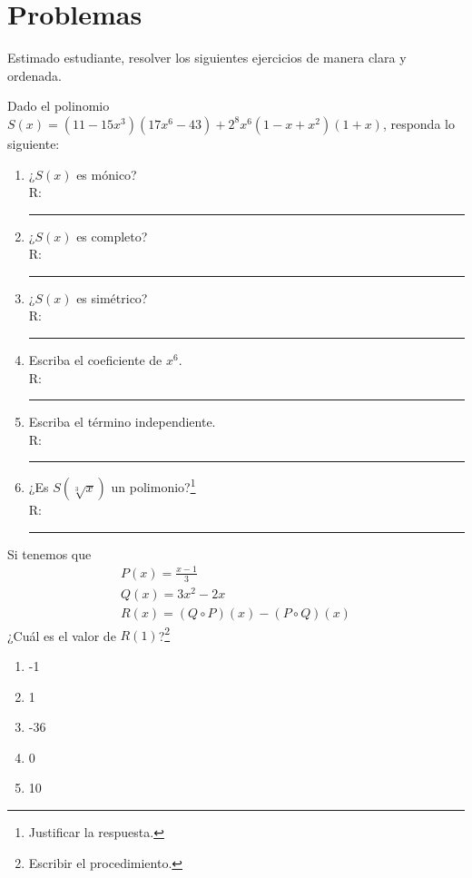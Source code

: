 \section*{\large Problemas}

Estimado estudiante, resolver los siguientes ejercicios de manera clara y ordenada.

\begin{exercise}
    Dado el polinomio $S(x) = (11 - 15x^3)(17x^6 - 43) + 2^8 x^6 (1 - x + x^2)(1 + x)$, responda lo siguiente:
    \begin{multicols}{2}
        \begin{enumerate}
            \item ¿$S(x)$ es mónico? \\R: \rule{1cm}{0.1mm}
            \item ¿$S(x)$ es completo? \\R: \rule{1cm}{0.1mm}
            \item ¿$S(x)$ es simétrico? \\R: \rule{1cm}{0.1mm}
            \item Escriba el coeficiente de $x^6$. \\R: \rule{1cm}{0.1mm}
            \item Escriba el término independiente.\\ R: \rule{1cm}{0.1mm}
            \item ¿Es $S(\sqrt[3]{x})$ un polimonio?\footnote{Justificar la respuesta.} \\ R: \rule{2cm}{0.1mm}
        \end{enumerate}
    \end{multicols}
\end{exercise}

\begin{exercise}
    Si tenemos que
    \begin{align*}
        P(x) = \frac{x - 1}{3} \\
        Q(x) = 3x^2 - 2x \\
        R(x) = (Q \circ P)(x) - (P \circ Q)(x)
    \end{align*}
    ¿Cuál es el valor de $R(1)$?\footnote{Escribir el procedimiento.}
    \begin{multicols}{5}
        \begin{enumerate}
            \item -1
            \item 1
            \item -36
            \item 0
            \item 10
        \end{enumerate}
    \end{multicols}
\end{exercise}

